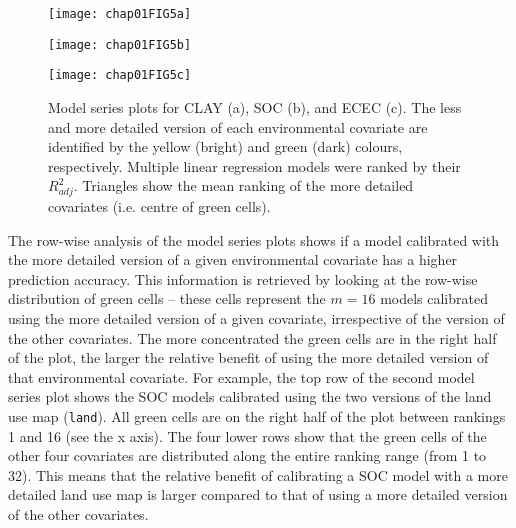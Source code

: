 \begin{figure}[!ht]
  \centering
    \begin{minipage}[b]{\textwidth}
      \subcaption{}
      \texttt{[image: chap01FIG5a]}
    \end{minipage}
    \begin{minipage}[b]{\textwidth}
      \subcaption{}
      \texttt{[image: chap01FIG5b]}
    \end{minipage}
    \begin{minipage}[b]{\textwidth}
      \subcaption{}
      \texttt{[image: chap01FIG5c]}
    \end{minipage}
  \caption{Model series plots for CLAY (a), SOC (b), and ECEC (c). The less and 
  more detailed version of each environmental covariate are identified by the 
  yellow (bright) and green (dark) colours, respectively. Multiple linear 
  regression models were ranked by their ${R}^{2}_{adj}$. Triangles show the 
  mean ranking of the more detailed covariates (i.e. centre of green cells).}
  \label{fig:model-series}
\end{figure}

The row-wise analysis of the model series plots shows if a model calibrated with
the more detailed version of a given environmental covariate has a higher 
prediction accuracy. This information is retrieved by looking at the row-wise 
distribution of green cells -- these cells represent the $m=16$ models 
calibrated using the more detailed version of a given covariate, irrespective 
of the version of the other covariates. The more concentrated the green cells 
are in the right half of the plot, the larger the relative benefit of using the
more detailed version of that environmental covariate. For example, the top row
of the second model series plot shows the SOC models calibrated using the two 
versions of the land use map (\texttt{land}). All green cells are on the right
half of the plot between rankings 1 and 16 (see the x axis). The four lower rows
show that the green cells of the other four covariates are distributed along the
entire ranking range (from 1 to 32). This means that the relative benefit of 
calibrating a SOC model with a more detailed land use map is larger compared to 
that of using a more detailed version of the other covariates.


